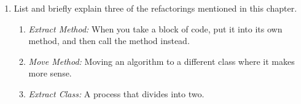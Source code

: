 \documentclass[11pt]{article}
\begin{document}
\begin{enumerate}
\item List and briefly explain three of the refactorings mentioned in this chapter.
\begin{enumerate} 
\item \textit{Extract Method:} When you take a block of code, put it into its own method, and then call the method instead.
\item \textit{Move Method:} Moving an algorithm to a different class where it makes more sense.
\item \textit{Extract Class:} A process that divides into two.
\end{enumerate}


\end{enumerate}
\end{document}
